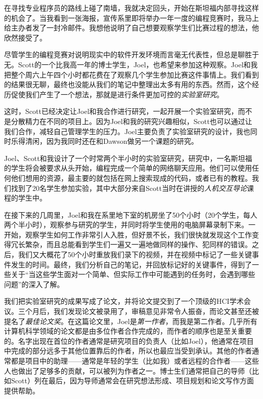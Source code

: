 \documentclass[letter,12pt]{book}
\begin{document}
\begin{CJK}{UTF8}{gbsn}
\breakline

在寻找专业程序员的路线上碰了南墙，我就决定回头，开始在斯坦福内部寻找这样的机会了。当我看到一张海报，宣传系里即将举办一年一度的编程竞赛时，我马上给主办者发了一封冷邮件。我想他说明了自己想要观察学生们比赛过程的想法，他欣然接受了。

尽管学生的编程竞赛对说明现实中的软件开发环境而言毫无代表性，但总是聊胜于无。Scott的一个比我高一年的博士学生，Joel，也希望来参加这种观察。Joel和我把整个周六上午四个小时都花费在了观察几个学生参加比赛这件事情上。我们看到的结果很无聊，最终也没能从我们的笔记中整理出太多有用的东西。然而，这个经历促使我们产生了一个想法，那就是进行条件更加可控的\emph{实验室研究}。

这时，Scott已经决定让Joel和我合作进行研究，一起开展一个实验室研究，而不是分散精力在不同的项目上。因为Joel和我的研究兴趣相似，Scott也可以通过让我们合作，减轻自己管理学生的压力。Joel主要负责了实验室研究的设计，我也同时乐得清闲，因为我同时还在和Dawson做另一个课题的研究。

Joel、Scott和我设计了一个时常两个半小时的实验室研究，研究中，一名斯坦福的学生将会被要求从头开始，编程完成一个简单的网络聊天应用。他们可以使用任何他们想用的资源，最主要的就包括在网上搜索现成的代码，或者已有的教程。我们找到了20名学生参加实验，其中大部分来自Scott当时在讲授的\emph{人机交互导论}课程的学生中。

在接下来的几周里，Joel和我在系里地下室的机房坐了50个小时（20个学生，每人两个半小时），观察参与研究的学生，并同时将学生使用的电脑屏幕录制下来。一开始，观察学生如何工作非常引人入胜，但好景不长，我们很快就发现这个工作变得冗长繁杂，而且总能看到学生们一遍又一遍地做同样的操作、犯同样的错误。之后，我们又大概花了50个小时重放我们录下的视频，并在视频中标记了一些关键事件发生的时间。最终，我们分析自己的笔记，并回放标记好的关键事件，得到了一些关于“当这些学生面对一个简单、但实际工作中可能遇到的任务时，会遇到哪些问题”的深入了解。

我们把实验室研究的成果写成了论文，并将论文提交到了一个顶级的HCI学术会议。三个月后，我们发现论文被录用了，审稿意见非常令人振奋，而论文甚至还被提名了\emph{最佳论文奖}。在这篇论文里，Joel是\emph{第一作者}，而我是第二作者。几乎所有计算机科学领域的论文都是由多位作者合作完成的，而作者的顺序也是至关重要的。名字出现在首位的作者通常是研究项目的负责人（比如Joel），他通常在项目中完成的部分远多于其他位置靠后的作者，所以也最应当受到承认。其他的作者通常都是项目中的助理——通常是年轻的学生（比如我）或者远程的合作者——这些人也做出了足够多的贡献，可以被列为作者之一。博士生们通常把自己的导师（比如Scott）列在最后，因为导师通常会在研究想法形成、项目规划和论文写作方面提供帮助。


\end{CJK}
\end{document}
